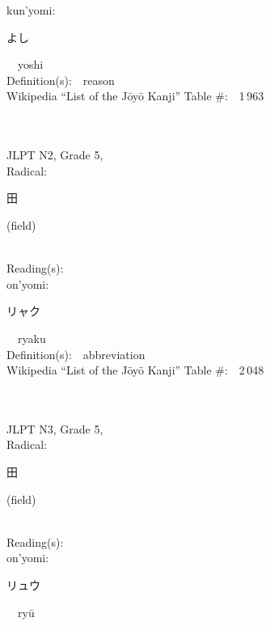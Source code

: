 \begin{multicols}{2}
{\hspace*{1em}}kun'yomi:\ \ \\
{\hspace*{2em}}{\begin{CJK}{UTF8}{min} よし \end{CJK}}\ \ yoshi\ \ \\
Definition(s):\ \ reason \\
Wikipedia ``List of the J\=oy\=o Kanji'' Table \#:\ \ 1\,963 \\
\ \ \\
{\fontsize{34pt}{40pt}  }\ \ \\  %
{JLPT N2, Grade 5, \\Radical:\ \ {\begin{CJK}{UTF8}{min} 田 \end{CJK}} (field) } \\
Reading(s):\ \ \\
{\hspace*{1em}}on'yomi:\ \ \\
{\hspace*{2em}}{\begin{CJK}{UTF8}{min} リャク \end{CJK}}\ \ ryaku\ \ \\
Definition(s):\ \ abbreviation \\
Wikipedia ``List of the J\=oy\=o Kanji'' Table \#:\ \ 2\,048 \\
\ \ \\
{\fontsize{34pt}{40pt}  }\ \ \\  %
{JLPT N3, Grade 5, \\Radical:\ \ {\begin{CJK}{UTF8}{min} 田 \end{CJK}} (field) } \\
Reading(s):\ \ \\
{\hspace*{1em}}on'yomi:\ \ \\
{\hspace*{2em}}{\begin{CJK}{UTF8}{min} リュウ \end{CJK}}\ \ ry\=u\ \ \\

\end{multicols}

